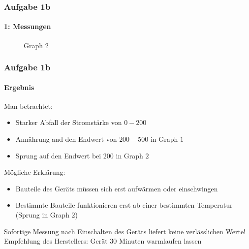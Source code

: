 \begin{frame}
\frametitle{Aufgabe 1b}
\framesubtitle{1: Messungen}
\begin{figure}[H]
\begin{center}
    \caption{Graph 2}
\end{center}
\end{figure}
\end{frame}
\begin{frame}
\frametitle{Aufgabe 1b}
\framesubtitle{Ergebnis}
    Man betrachtet:
    \begin{itemize}
        \item Starker Abfall der Stromstärke von $0-200$
        \item Annährung and den Endwert von $200-500$ in Graph $1$
        \item Sprung auf den Endwert bei $200$ in Graph $2$
    \end{itemize}
    Mögliche Erklärung:
     \begin{itemize}
         \item Bauteile des Geräts müssen sich erst aufwärmen oder einschwingen
         \item Bestimmte Bauteile funktionieren erst ab einer bestimmten
         Temperatur (Sprung in Graph $2$)
     \end{itemize}
    Sofortige Messung nach Einschalten des Geräts liefert keine verlässlichen
    Werte! \\
    Empfehlung des Herstellers: Gerät $30$ Minuten warmlaufen lassen
\end{frame}
